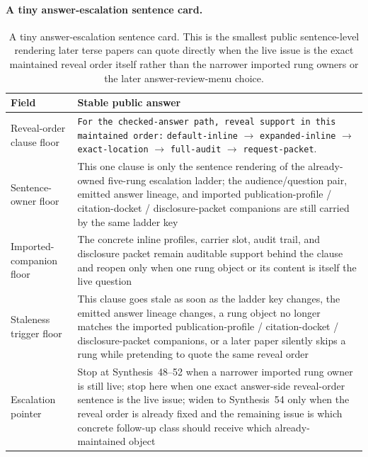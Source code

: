 \documentclass[11pt]{article}
\begin{document}
\paragraph{A tiny answer-escalation sentence card.}
\begin{table}[t]
\centering
\small
\begin{tabularx}{\linewidth}{@{}LY@{}}
\toprule
Field & Stable public answer \\
\midrule
Reveal-order clause floor & \texttt{For the checked-answer path, reveal support in this maintained order:}\newline
\texttt{default-inline} $\to$ \texttt{expanded-inline} $\to$ \texttt{exact-location} $\to$ \texttt{full-audit} $\to$ \texttt{request-packet}. \\
Sentence-owner floor & This one clause is only the sentence rendering of the already-owned five-rung escalation ladder; the audience/question pair, emitted answer lineage, and imported publication-profile / citation-docket / disclosure-packet companions are still carried by the same ladder key \\
Imported-companion floor & The concrete inline profiles, carrier slot, audit trail, and disclosure packet remain auditable support behind the clause and reopen only when one rung object or its content is itself the live question \\
Staleness trigger floor & This clause goes stale as soon as the ladder key changes, the emitted answer lineage changes, a rung object no longer matches the imported publication-profile / citation-docket / disclosure-packet companions, or a later paper silently skips a rung while pretending to quote the same reveal order \\
Escalation pointer & Stop at Synthesis~48--52 when a narrower imported rung owner is still live; stop here when one exact answer-side reveal-order sentence is the live issue; widen to Synthesis~54 only when the reveal order is already fixed and the remaining issue is which concrete follow-up class should receive which already-maintained object \\
\bottomrule
\end{tabularx}
\caption{A tiny answer-escalation sentence card. This is the smallest public sentence-level rendering later terse papers can quote directly when the live issue is the exact maintained reveal order itself rather than the narrower imported rung owners or the later answer-review-menu choice.}
\label{tab:tiny-answer-escalation-sentence-card}
\end{table}
\end{document}
